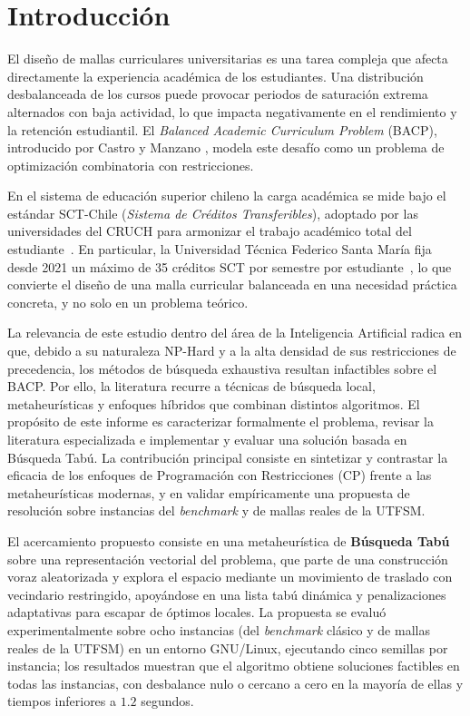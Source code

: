 \documentclass[letter, 10pt]{article}
\begin{document}
\newpage


\section{Introducci\'{o}n}

El dise\~{n}o de mallas curriculares universitarias es una tarea compleja que afecta directamente la experiencia acad\'{e}mica de los estudiantes. Una distribuci\'{o}n desbalanceada de los cursos puede provocar periodos de saturaci\'{o}n extrema alternados con baja actividad, lo que impacta negativamente en el rendimiento y la retenci\'{o}n estudiantil. El \textit{Balanced Academic Curriculum Problem} (BACP), introducido por Castro y Manzano \cite{Castro2001}, modela este desaf\'{i}o como un problema de optimizaci\'{o}n combinatoria con restricciones.


En el sistema de educaci\'on superior chileno la carga acad\'emica se mide
bajo el est\'andar SCT-Chile (\textit{Sistema de Cr\'editos Transferibles}),
adoptado por las universidades del CRUCH para armonizar el trabajo acad\'emico
total del estudiante~\cite{sctchile}. En particular, la Universidad T\'ecnica
Federico Santa Mar\'ia fija desde 2021 un m\'aximo de 35 cr\'editos SCT por
semestre por estudiante~\cite{usmcreditos}, lo que convierte el dise\~no de una
malla curricular balanceada en una necesidad pr\'actica concreta, y no solo en
un problema te\'orico.


La relevancia de este estudio dentro del \'{a}rea de la Inteligencia Artificial radica en que, debido a su naturaleza NP-Hard y a la alta densidad de sus restricciones de precedencia, los m\'etodos de b\'usqueda exhaustiva resultan infactibles sobre el BACP. Por ello, la literatura recurre a t\'ecnicas de b\'usqueda local, metaheur\'isticas y enfoques h\'ibridos que combinan distintos algoritmos. El prop\'{o}sito de este informe es caracterizar formalmente el problema, revisar la literatura especializada e implementar y evaluar una soluci\'on basada en B\'usqueda Tab\'u. La contribuci\'{o}n principal consiste en sintetizar y contrastar la eficacia de los enfoques de Programaci\'{o}n con Restricciones (CP) frente a las metaheur\'{i}sticas modernas, y en validar emp\'iricamente una propuesta de resoluci\'on sobre instancias del \textit{benchmark} y de mallas reales de la UTFSM.

El acercamiento propuesto consiste en una metaheur\'istica de \textbf{B\'usqueda Tab\'u} sobre una representaci\'on vectorial del problema, que parte de una construcci\'on voraz aleatorizada y explora el espacio mediante un movimiento de traslado con vecindario restringido, apoy\'andose en una lista tab\'u din\'amica y penalizaciones adaptativas para escapar de \'optimos locales. La propuesta se evalu\'o experimentalmente sobre ocho instancias (del \textit{benchmark} cl\'asico y de mallas reales de la UTFSM) en un entorno GNU/Linux, ejecutando cinco semillas por instancia; los resultados muestran que el algoritmo obtiene soluciones factibles en todas las instancias, con desbalance nulo o cercano a cero en la mayor\'ia de ellas y tiempos inferiores a $1.2$ segundos.
\end{document}
